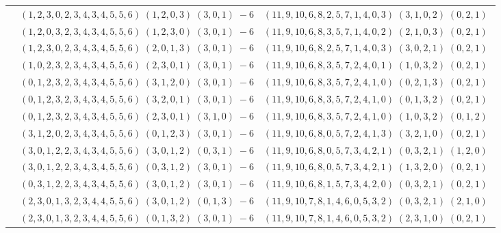 \documentclass[11pt]{article}
\begin{document}
\begin{longtable}[l]{|c|c|c|}
 \cline{2-3} 
 & $(1 ,2 ,3 ,0 ,2 ,3 ,4 ,3 ,4 ,5 ,5 ,6) \;(1 ,2 ,0 ,3) \;(3 ,0 ,1) \;-6$ & $(11 ,9 ,10 ,6 ,8 ,2 ,5 ,7 ,1 ,4 ,0 ,3) \;(3 ,1 ,0 ,2) \;(0 ,2 ,1) \;$\\ 
 \cline{2-3} 
 & $(1 ,2 ,0 ,3 ,2 ,3 ,4 ,3 ,4 ,5 ,5 ,6) \;(1 ,2 ,3 ,0) \;(3 ,0 ,1) \;-6$ & $(11 ,9 ,10 ,6 ,8 ,3 ,5 ,7 ,1 ,4 ,0 ,2) \;(2 ,1 ,0 ,3) \;(0 ,2 ,1) \;$\\ 
 \cline{2-3} 
 & $(1 ,2 ,3 ,0 ,2 ,3 ,4 ,3 ,4 ,5 ,5 ,6) \;(2 ,0 ,1 ,3) \;(3 ,0 ,1) \;-6$ & $(11 ,9 ,10 ,6 ,8 ,2 ,5 ,7 ,1 ,4 ,0 ,3) \;(3 ,0 ,2 ,1) \;(0 ,2 ,1) \;$\\ 
 \cline{2-3} 
 & $(1 ,0 ,2 ,3 ,2 ,3 ,4 ,3 ,4 ,5 ,5 ,6) \;(2 ,3 ,0 ,1) \;(3 ,0 ,1) \;-6$ & $(11 ,9 ,10 ,6 ,8 ,3 ,5 ,7 ,2 ,4 ,0 ,1) \;(1 ,0 ,3 ,2) \;(0 ,2 ,1) \;$\\ 
 \cline{2-3} 
 & $(0 ,1 ,2 ,3 ,2 ,3 ,4 ,3 ,4 ,5 ,5 ,6) \;(3 ,1 ,2 ,0) \;(3 ,0 ,1) \;-6$ & $(11 ,9 ,10 ,6 ,8 ,3 ,5 ,7 ,2 ,4 ,1 ,0) \;(0 ,2 ,1 ,3) \;(0 ,2 ,1) \;$\\ 
 \cline{2-3} 
 & $(0 ,1 ,2 ,3 ,2 ,3 ,4 ,3 ,4 ,5 ,5 ,6) \;(3 ,2 ,0 ,1) \;(3 ,0 ,1) \;-6$ & $(11 ,9 ,10 ,6 ,8 ,3 ,5 ,7 ,2 ,4 ,1 ,0) \;(0 ,1 ,3 ,2) \;(0 ,2 ,1) \;$\\ 
 \cline{2-3} 
 & $(0 ,1 ,2 ,3 ,2 ,3 ,4 ,3 ,4 ,5 ,5 ,6) \;(2 ,3 ,0 ,1) \;(3 ,1 ,0) \;-6$ & $(11 ,9 ,10 ,6 ,8 ,3 ,5 ,7 ,2 ,4 ,1 ,0) \;(1 ,0 ,3 ,2) \;(0 ,1 ,2) \;$\\ 
 \cline{2-3} 
 & $(3 ,1 ,2 ,0 ,2 ,3 ,4 ,3 ,4 ,5 ,5 ,6) \;(0 ,1 ,2 ,3) \;(3 ,0 ,1) \;-6$ & $(11 ,9 ,10 ,6 ,8 ,0 ,5 ,7 ,2 ,4 ,1 ,3) \;(3 ,2 ,1 ,0) \;(0 ,2 ,1) \;$\\ 
 \cline{2-3} 
 & $(3 ,0 ,1 ,2 ,2 ,3 ,4 ,3 ,4 ,5 ,5 ,6) \;(3 ,0 ,1 ,2) \;(0 ,3 ,1) \;-6$ & $(11 ,9 ,10 ,6 ,8 ,0 ,5 ,7 ,3 ,4 ,2 ,1) \;(0 ,3 ,2 ,1) \;(1 ,2 ,0) \;$\\ 
 \cline{2-3} 
 & $(3 ,0 ,1 ,2 ,2 ,3 ,4 ,3 ,4 ,5 ,5 ,6) \;(0 ,3 ,1 ,2) \;(3 ,0 ,1) \;-6$ & $(11 ,9 ,10 ,6 ,8 ,0 ,5 ,7 ,3 ,4 ,2 ,1) \;(1 ,3 ,2 ,0) \;(0 ,2 ,1) \;$\\ 
 \cline{2-3} 
 & $(0 ,3 ,1 ,2 ,2 ,3 ,4 ,3 ,4 ,5 ,5 ,6) \;(3 ,0 ,1 ,2) \;(3 ,0 ,1) \;-6$ & $(11 ,9 ,10 ,6 ,8 ,1 ,5 ,7 ,3 ,4 ,2 ,0) \;(0 ,3 ,2 ,1) \;(0 ,2 ,1) \;$\\ 
 \cline{2-3} 
 & $(2 ,3 ,0 ,1 ,3 ,2 ,3 ,4 ,4 ,5 ,5 ,6) \;(3 ,0 ,1 ,2) \;(0 ,1 ,3) \;-6$ & $(11 ,9 ,10 ,7 ,8 ,1 ,4 ,6 ,0 ,5 ,3 ,2) \;(0 ,3 ,2 ,1) \;(2 ,1 ,0) \;$\\ 
 \cline{2-3} 
 & $(2 ,3 ,0 ,1 ,3 ,2 ,3 ,4 ,4 ,5 ,5 ,6) \;(0 ,1 ,3 ,2) \;(3 ,0 ,1) \;-6$ & $(11 ,9 ,10 ,7 ,8 ,1 ,4 ,6 ,0 ,5 ,3 ,2) \;(2 ,3 ,1 ,0) \;(0 ,2 ,1) \;$\\ 

\end{longtable}
\end{document}
